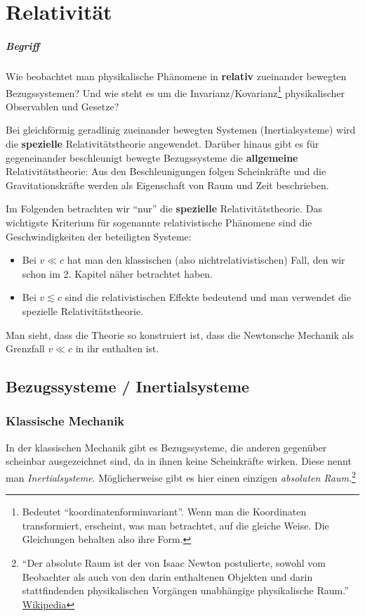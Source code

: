 \chapter{Relativität}

\paragraph{Begriff} Wie beobachtet man physikalische Phänomene in \textbf{relativ} zueinander bewegten Bezugssystemen? Und wie steht es um die Invarianz/Kovarianz\footnote{Bedeutet ``koordinatenforminvariant''. Wenn man die Koordinaten transformiert, erscheint, was man betrachtet, auf die gleiche Weise. Die Gleichungen behalten also ihre Form.} physikalischer Observablen und Gesetze?

Bei gleichförmig geradlinig zueinander bewegten Systemen (Inertialsysteme) wird die \textbf{spezielle} Relativitätstheorie angewendet. Darüber hinaus gibt es für gegeneinander beschleunigt bewegte Bezugssysteme die \textbf{allgemeine} Relativitätstheorie: Aus den Beschleunigungen folgen Scheinkräfte und die Gravitationskräfte werden als Eigenschaft von Raum und Zeit beschrieben.

Im Folgenden betrachten wir "`nur"' die \textbf{spezielle} Relativitätstheorie.
Das wichtigste Kriterium für sogenannte relativistische Phänomene sind die Geschwindigkeiten der beteiligten Systeme:
\begin{itemize}
	\item Bei $v \ll c$ hat man den klassischen (also nichtrelativistischen) Fall, den wir schon im 2. Kapitel näher betrachtet haben.
	\item Bei $v \lesssim c $ sind die relativistischen Effekte bedeutend und man verwendet die spezielle Relativitätstheorie.
\end{itemize}
Man sieht, dass die Theorie so konstruiert ist, dass die Newtonsche Mechanik als Grenzfall $v \ll c$ in ihr enthalten ist.

\section{Bezugssysteme / Inertialsysteme}
\subsection{Klassische Mechanik}
In der klassischen Mechanik gibt es Bezugssysteme, die anderen gegenüber scheinbar ausgezeichnet sind, da in ihnen keine Scheinkräfte wirken. Diese nennt man \textit{Inertialsysteme}. Möglicherweise gibt es hier einen einzigen \textit{absoluten Raum}.\footnote{"`Der absolute Raum ist der von Isaac Newton postulierte, sowohl vom Beobachter als auch von den darin enthaltenen Objekten und darin stattfindenden physikalischen Vorgängen unabhängige physikalische Raum."' \href{https://de.wikipedia.org/wiki/Absoluter_Raum}{Wikipedia}}

